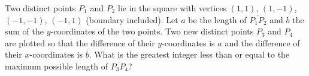 Two distinct points $P_1$ and $P_2$ lie in the square with vertices $(1,1)$, $(1,-1)$, $(-1,-1)$, $(-1,1)$ (boundary included). Let $a$ be the length of $\overline{P_1P_2}$ and $b$ the sum of the $y$-coordinates of the two points. Two new distinct points $P_3$ and $P_4$ are plotted so that the difference of their $y$-coordinates is $a$ and the difference of their $x$-coordinates is $b$. What is the greatest integer less than or equal to the maximum possible length of $\overline{P_3P_4}$?
